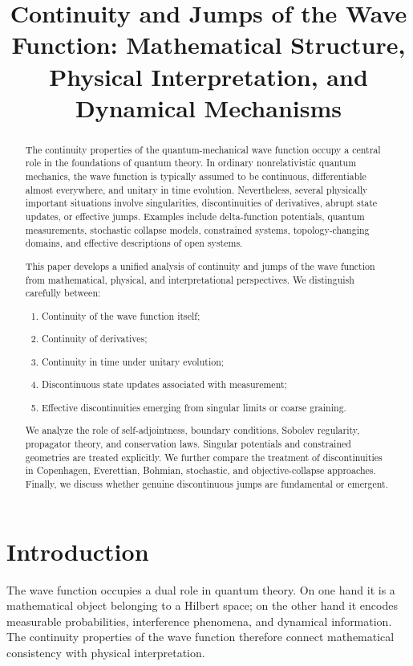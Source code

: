 \documentclass[11pt]{article}
\title{ Continuity and Jumps of the Wave Function: Mathematical Structure, Physical Interpretation, and Dynamical Mechanisms}
\begin{document}
\maketitle
\begin{abstract}

The continuity properties of the quantum-mechanical wave function 
    occupy a central role in the foundations of quantum theory. In
    ordinary nonrelativistic quantum mechanics, the wave function 
    is typically assumed to be continuous, differentiable almost everywhere,
    and unitary in time evolution. Nevertheless, several physically important
    situations involve singularities, discontinuities of derivatives, 
    abrupt state updates, or effective jumps. Examples include 
    delta-function potentials, quantum measurements, stochastic 
    collapse models, constrained systems, topology-changing domains,
    and effective descriptions of open systems.

This paper develops a unified analysis of continuity and jumps 
    of the wave function from mathematical, physical, and 
    interpretational perspectives. We distinguish carefully between:
\begin{enumerate}
   \item Continuity of the wave function itself;
   \item Continuity of derivatives;
   \item Continuity in time under unitary evolution;
   \item Discontinuous state updates associated with measurement;
   \item Effective discontinuities emerging from singular limits or coarse graining.
\end{enumerate}
We analyze the role of self-adjointness, boundary conditions, Sobolev regularity,
    propagator theory, and conservation laws. Singular potentials and constrained
    geometries are treated explicitly. We further compare the treatment of 
    discontinuities in Copenhagen, Everettian, Bohmian, stochastic, and 
    objective-collapse approaches. Finally, we discuss whether genuine 
    discontinuous jumps are fundamental or emergent.

\end{abstract}

\section{Introduction}

The wave function occupies a dual role in quantum theory. On one hand 
it is a mathematical object belonging to a Hilbert space; on the other
hand it encodes measurable probabilities, interference phenomena, and
dynamical information. The continuity properties of the wave function
therefore connect mathematical consistency with physical interpretation.
\end{document}
